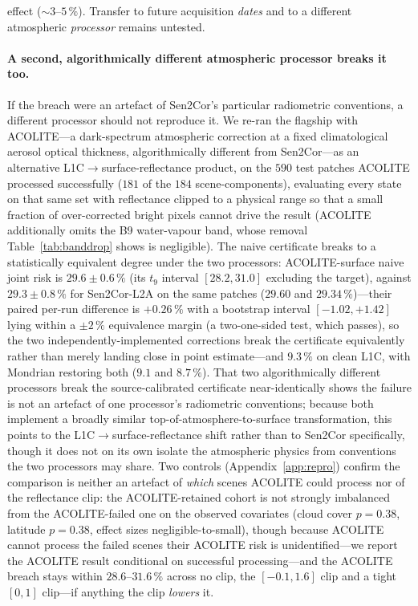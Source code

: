 \documentclass[preprint,3p,times]{elsarticle}
\begin{document}
effect (${\sim}3$--$5\,\%$). Transfer to future acquisition \emph{dates} and to a different atmospheric \emph{processor} remains untested.

\paragraph{A second, algorithmically different atmospheric processor breaks it too.} If the breach were an artefact of Sen2Cor's particular radiometric conventions, a different processor should not reproduce it. We re-ran the flagship with ACOLITE---a dark-spectrum atmospheric correction at a fixed climatological aerosol optical thickness, algorithmically different from Sen2Cor---as an alternative L1C$\to$surface-reflectance product, on the $590$ test patches ACOLITE processed successfully ($181$ of the $184$ scene-components), evaluating every state on that same set with reflectance clipped to a physical range so that a small fraction of over-corrected bright pixels cannot drive the result (ACOLITE additionally omits the B9 water-vapour band, whose removal Table~\ref{tab:banddrop} shows is negligible). The naive certificate breaks to a statistically equivalent degree under the two processors: ACOLITE-surface naive joint risk is $29.6 \pm 0.6\,\%$ (its $t_9$ interval $[28.2, 31.0]$ excluding the target), against $29.3 \pm 0.8\,\%$ for Sen2Cor-L2A on the same patches ($29.60$ and $29.34\,\%$)---their paired per-run difference is $+0.26\,\%$ with a bootstrap interval $[-1.02, +1.42]$ lying within a $\pm 2\,\%$ equivalence margin (a two-one-sided test, which passes), so the two independently-implemented corrections break the certificate equivalently rather than merely landing close in point estimate---and $9.3\,\%$ on clean L1C, with Mondrian restoring both ($9.1$ and $8.7\,\%$). That two algorithmically different processors break the source-calibrated certificate near-identically shows the failure is not an artefact of one processor's radiometric conventions; because both implement a broadly similar top-of-atmosphere-to-surface transformation, this points to the L1C$\to$surface-reflectance shift rather than to Sen2Cor specifically, though it does not on its own isolate the atmospheric physics from conventions the two processors may share. Two controls (Appendix~\ref{app:repro}) confirm the comparison is neither an artefact of \emph{which} scenes ACOLITE could process nor of the reflectance clip: the ACOLITE-retained cohort is not strongly imbalanced from the ACOLITE-failed one on the observed covariates (cloud cover $p=0.38$, latitude $p=0.38$, effect sizes negligible-to-small), though because ACOLITE cannot process the failed scenes their ACOLITE risk is unidentified---we report the ACOLITE result conditional on successful processing---and the ACOLITE breach stays within $28.6$--$31.6\,\%$ across no clip, the $[-0.1,1.6]$ clip and a tight $[0,1]$ clip---if anything the clip \emph{lowers} it.
\end{document}
